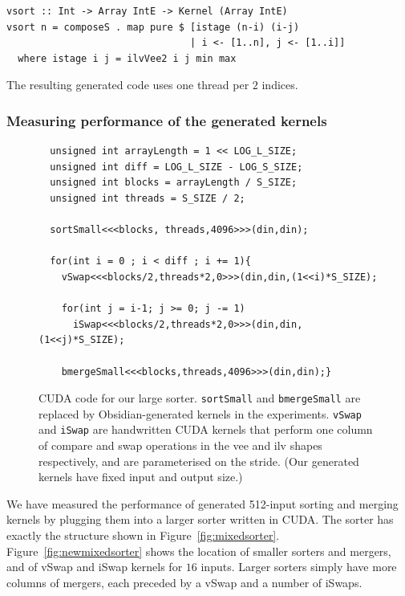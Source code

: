 \begin{codesize}
\begin{verbatim}
vsort :: Int -> Array IntE -> Kernel (Array IntE)
vsort n = composeS . map pure $ [istage (n-i) (i-j) 
                                | i <- [1..n], j <- [1..i]]
  where istage i j = ilvVee2 i j min max
\end{verbatim}
\end{codesize}
\normalfont
\noindent
The resulting generated code uses one thread per
$2$ indices.

\subsubsection{Measuring performance of the generated kernels}\label{sec:benchmarks}
\begin{figure}
\begin{codesize}
\begin{verbatim}
  unsigned int arrayLength = 1 << LOG_L_SIZE;
  unsigned int diff = LOG_L_SIZE - LOG_S_SIZE;
  unsigned int blocks = arrayLength / S_SIZE;
  unsigned int threads = S_SIZE / 2;
  
  sortSmall<<<blocks, threads,4096>>>(din,din);
 
  for(int i = 0 ; i < diff ; i += 1){ 
    vSwap<<<blocks/2,threads*2,0>>>(din,din,(1<<i)*S_SIZE);
     
    for(int j = i-1; j >= 0; j -= 1)
      iSwap<<<blocks/2,threads*2,0>>>(din,din,(1<<j)*S_SIZE);
      
    bmergeSmall<<<blocks,threads,4096>>>(din,din);}
\end{verbatim}
\end{codesize}
\normalfont
\caption{CUDA code for our large sorter. {\tt sortSmall} and {\tt bmergeSmall}
are replaced by Obsidian-generated kernels in the experiments. {\tt vSwap} and {\tt iSwap} are handwritten CUDA kernels
that perform one column of compare and swap operations in the vee and ilv shapes respectively, and are
parameterised on the stride. (Our generated kernels have fixed input and output size.)}
\label{fig:CUDAsort}
\end{figure}
We have measured the performance of generated 512-input sorting and merging kernels by plugging them into a larger sorter written in CUDA.
The sorter has exactly the structure shown in Figure~\ref{fig:mixedsorter}.
Figure~\ref{fig:newmixedsorter} shows the location of smaller sorters and mergers, and of vSwap and iSwap kernels for $16$ inputs.
Larger sorters simply have more columns of mergers, each preceded by a vSwap and a number of iSwaps.
